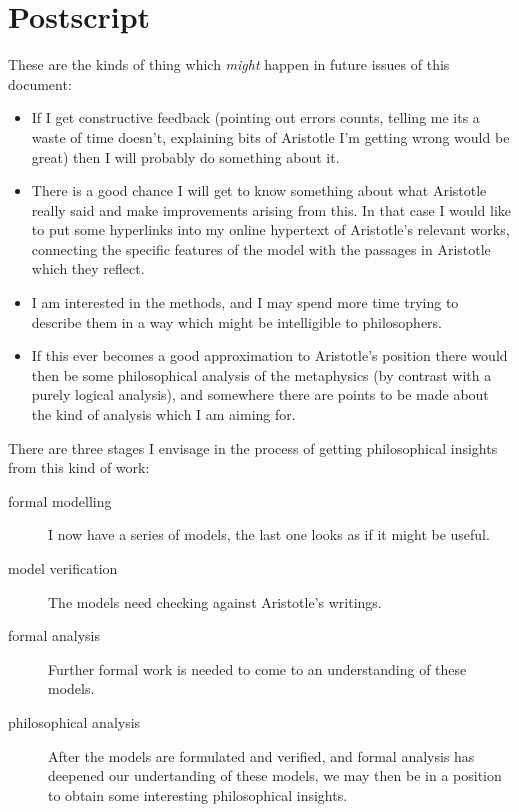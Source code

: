 
\section{Postscript}\label{POSTSCRIPT}

These are the kinds of thing which {\it might} happen in future issues of this document:

\begin{itemize}
\item If I get constructive feedback (pointing out errors counts, telling me its a waste of time doesn't, explaining bits of Aristotle I'm getting wrong would be great) then I will probably do something about it.

\item There is a good chance I will get to know something about what Aristotle really said and make improvements arising from this.
In that case I would like to put some hyperlinks into my online hypertext of Aristotle's relevant works, connecting the specific features of the model with the passages in Aristotle which they reflect.

\item I am interested in the methods, and I may spend more time trying to describe them in a way which might be intelligible to philosophers.

\item If this ever becomes a good approximation to Aristotle's position there would then be some philosophical analysis of the metaphysics (by contrast with a purely logical analysis), and somewhere there are points to be made about the kind of analysis which I am aiming for.
\end{itemize}

There are three stages I envisage in the process of getting philosophical insights from this kind of work:

\begin{description}
\item[formal modelling]
I now have a series of models, the last one looks as if it might be useful.

\item[model verification]
The models need checking against Aristotle's writings.

\item[formal analysis]
Further formal work is needed to come to an understanding of these models.

\item[philosophical analysis]
After the models are formulated and verified, and formal analysis has deepened our undertanding of these models, we may then be in a position to obtain some interesting philosophical insights.

\end{description}

